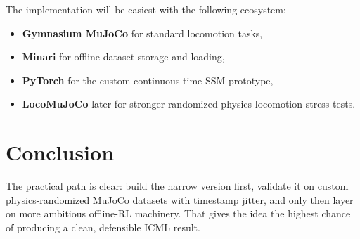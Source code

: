 \documentclass[11pt]{article}
\begin{document}
The implementation will be easiest with the following ecosystem:
\begin{itemize}[leftmargin=1.5em]
    \item \textbf{Gymnasium MuJoCo} for standard locomotion tasks,
    \item \textbf{Minari} for offline dataset storage and loading,
    \item \textbf{PyTorch} for the custom continuous-time SSM prototype,
    \item \textbf{LocoMuJoCo} later for stronger randomized-physics locomotion stress tests.
\end{itemize}

\section{Conclusion}

The practical path is clear: build the narrow version first, validate it on custom physics-randomized MuJoCo datasets with timestamp jitter, and only then layer on more ambitious offline-RL machinery. That gives the idea the highest chance of producing a clean, defensible ICML result.
\end{document}

